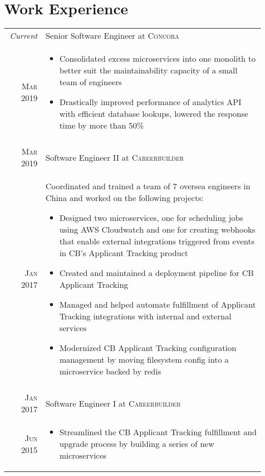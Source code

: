\documentclass[a4paper,10pt]{article}
\begin{document}
\section{Work Experience}
\begin{tabular}{r|p{13cm}}
 \emph{Current} & Senior Software Engineer at \textsc{Concora} \\
 \textsc{Mar 2019} &
 \begin{itemize}
  \item \footnotesize{Consolidated excess microservices into one monolith to better suit the maintainability capacity of a small team of engineers}
  \item \footnotesize{Drastically improved performance of analytics API with efficient database lookups, lowered the response time by more than 50\%}
 \end{itemize}
 \\
 \multicolumn{2}{c}{} \\ 
 \textsc{Mar 2019} & Software Engineer II at \textsc{Careerbuilder} \\
 \textsc{Jan 2017} &
 \footnotesize{Coordinated and trained a team of 7 oversea engineers in China and worked on the following projects:}
 \begin{itemize}
  \item \footnotesize{Designed two microservices, one for scheduling jobs using AWS Cloudwatch and one for creating webhooks that enable external integrations triggered from events in CB's Applicant Tracking product }
  \item \footnotesize{Created and maintained a deployment pipeline for CB Applicant Tracking}
  \item \footnotesize{Managed and helped automate fulfillment of Applicant Tracking integrations with internal and external services}
  \item \footnotesize{Modernized CB Applicant Tracking configuration management by moving filesystem config into a microservice backed by redis}
 \end{itemize}
 \\
 \multicolumn{2}{c}{} \\
 \textsc{Jan 2017} & Software Engineer I at \textsc{Careerbuilder} \\
 \textsc{Jun 2015} &
 \begin{itemize}
   \item \footnotesize{Streamlined the CB Applicant Tracking fulfillment and upgrade process by building a series of new microservices}

\end{itemize}
\end{tabular}
\end{document}
